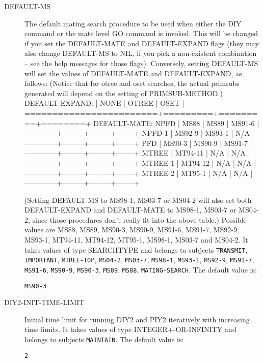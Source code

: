 \begin{description}
\item[DEFAULT-MS]  
The default mating search procedure to be used when either the DIY command or the
mate level GO command is invoked. This will be changed if you set the 
DEFAULT-MATE and DEFAULT-EXPAND flags (they may also change DEFAULT-MS 
to NIL, if you pick a non-existent combination -- see the help messages
for those flags). Conversely, setting DEFAULT-MS will set the values 
of DEFAULT-MATE and DEFAULT-EXPAND, as follows:
(Notice that for otree and oset searches, the actual primsubs generated will
depend on the setting of PRIMSUB-METHOD.)
        DEFAULT-EXPAND:        |  NONE   |  OTREE  |  OSET  |
       ========================+=========+=========+========+
DEFAULT-MATE:          NPFD    |  MS88   |   MS89  | MS91-6 |
                 --------------+---------+---------+--------+
                      NPFD-1   | MS92-9  |  MS93-1 |  N/A   |
                 --------------+---------+---------+--------+
                        PFD    | MS90-3  |  MS90-9 | MS91-7 |
                 --------------+---------+---------+--------+
                      MTREE    | MT94-11 |   N/A   |  N/A   |
                 --------------+---------+---------+--------+
                     MTREE-1   | MT94-12 |   N/A   |  N/A   |
                 --------------+---------+---------+--------+
                     MTREE-2   | MT95-1  |   N/A   |  N/A   |
                 --------------+---------+---------+--------+

(Setting DEFAULT-MS to MS98-1, MS03-7 or MS04-2 will also set both DEFAULT-EXPAND and DEFAULT-MATE
to MS98-1, MS03-7 or MS04-2, since those procedures don't really fit into the above table.)
Possible values are MS88, MS89, MS90-3, MS90-9, MS91-6, MS91-7, MS92-9, 
MS93-1, MT94-11, MT94-12, MT95-1, MS98-1, MS03-7 and MS04-2.
It takes values of type SEARCHTYPE and belongs to subjects \texttt{TRANSMIT}, \texttt{IMPORTANT}, \texttt{MTREE-TOP}, \texttt{MS04-2}, \texttt{MS03-7}, \texttt{MS98-1}, \texttt{MS93-1}, \texttt{MS92-9}, \texttt{MS91-7}, \texttt{MS91-6}, \texttt{MS90-9}, \texttt{MS90-3}, \texttt{MS89}, \texttt{MS88}, \texttt{MATING-SEARCH}.  The default value is: \begin{lstlisting}
MS90-3
\end{lstlisting}

\item[DIY2-INIT-TIME-LIMIT]  
Initial time limit for running DIY2 and PIY2 iteratively with 
increasing time limits.
It takes values of type INTEGER+-OR-INFINITY and belongs to subjects \texttt{MAINTAIN}.  The default value is: \begin{lstlisting}
2
\end{lstlisting}


\end{description}
